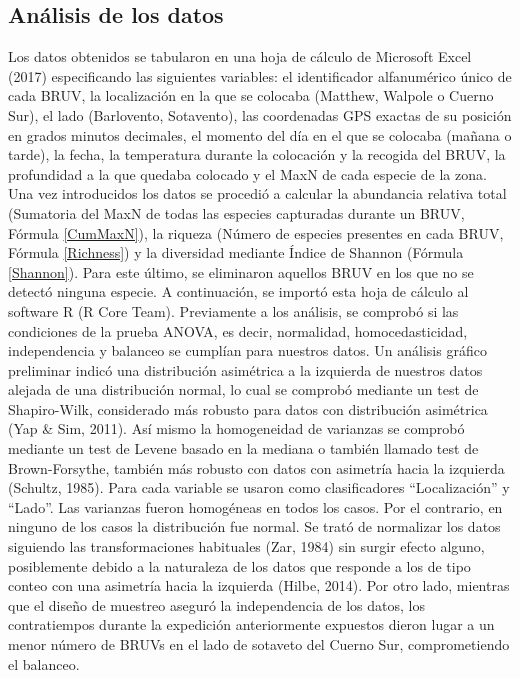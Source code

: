\documentclass[a4paper, 11pt]{article}
\begin{document}
\subsection{Análisis de los datos}
Los datos obtenidos se tabularon en una hoja de cálculo de Microsoft Excel (2017) especificando las siguientes variables: el identificador alfanumérico único de cada BRUV, la localización en la que se colocaba (Matthew, Walpole o Cuerno Sur), el lado (Barlovento, Sotavento), las coordenadas GPS exactas de su posición en grados minutos decimales, el momento del día en el que se colocaba (mañana o tarde), la fecha, la temperatura durante la colocación y la recogida del BRUV, la profundidad a la que quedaba colocado y el MaxN de cada especie de la zona.
Una vez introducidos los datos se procedió a calcular la abundancia relativa total (Sumatoria del MaxN de todas las especies capturadas durante un BRUV, Fórmula \ref{CumMaxN}), la riqueza (Número de especies presentes en cada BRUV, Fórmula \ref{Richness}) y la diversidad mediante Índice de Shannon (Fórmula \ref{Shannon}). Para este último, se eliminaron aquellos BRUV en los que no se detectó ninguna especie.
A continuación, se importó esta hoja de cálculo al software R (R Core Team). Previamente a los análisis, se comprobó si las condiciones de la prueba ANOVA, es decir, normalidad, homocedasticidad, independencia y balanceo se cumplían para nuestros datos. Un análisis gráfico preliminar indicó una distribución asimétrica a la izquierda de nuestros datos alejada de una distribución normal, lo cual se comprobó mediante un test de Shapiro-Wilk, considerado más robusto para datos con distribución asimétrica (Yap & Sim, 2011). Así mismo la homogeneidad de varianzas se comprobó mediante un test de Levene basado en la mediana o también llamado test de Brown-Forsythe, también más robusto con datos con asimetría hacia la izquierda (Schultz, 1985). Para cada variable se usaron como clasificadores “Localización” y “Lado”. Las varianzas fueron homogéneas en todos los casos. Por el contrario, en ninguno de los casos la distribución fue normal. Se trató de normalizar los datos siguiendo las transformaciones habituales (Zar, 1984) sin surgir efecto alguno, posiblemente debido a la naturaleza de los datos que responde a los de tipo conteo con una asimetría hacia la izquierda (Hilbe, 2014). Por otro lado, mientras que el diseño de muestreo aseguró la independencia de los datos, los contratiempos durante la expedición anteriormente expuestos dieron lugar a un menor número de BRUVs en el lado de sotaveto del Cuerno Sur, comprometiendo el balanceo.
\end{document}

